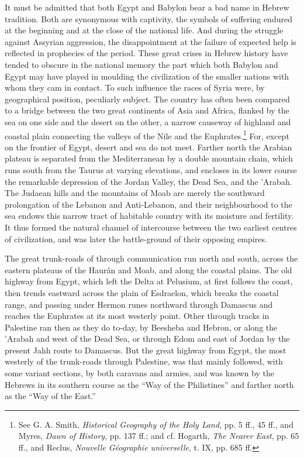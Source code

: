\documentclass[12pt,oneside]{book}
\begin{document}
It must be admitted that both Egypt and Babylon bear a bad name in Hebrew tradition. Both are synonymous with captivity, the symbols of suffering endured at the beginning and at the close of the national life. And during the struggle against Assyrian aggression, the disappointment at the failure of expected help is reflected in prophecies of the period. These great crises in Hebrew history have tended to obscure in the national memory the part which both Babylon and Egypt may have played in moulding the civilization of the smaller nations with whom they cam in contact. To such influence the races of Syria were, by geographical position, peculiarly subject. The country has often been compared to a bridge between the two great continents of Asia and Africa, flanked by the sea on one side and the desert on the other, a narrow causeway of highland and coastal plain connecting the valleys of the Nile and the Euphrates.\footnote{See G. A. Smith, \textit{Historical Geography of the Holy Land}, pp. 5 ff., 45 ff., and Myres, \textit{Dawn of History}, pp. 137 ff.; and cf. Hogarth, \textit{The Nearer East}, pp. 65 ff., and Reclus, \textit{Nouvelle G\'eographie universelle}, t. IX, pp. 685 ff.} For, except on the frontier of Egypt, desert and sea do not meet. Farther north the Arabian plateau is separated from the Mediterranean by a double mountain chain, which runs south from the Taurus at varying elevations, and encloses in its lower course the remarkable depression of the Jordan Valley, the Dead Sea, and the 'Arabah. The Judaean hills and the mountains of Moab are merely the southward prolongation of the Lebanon and Anti-Lebanon, and their neighbourhood to the sea endows this narrow tract of habitable country with its moisture and fertility. It thus formed the natural channel of intercourse between the two earliest centres of civilization, and was later the battle-ground of their opposing empires. \par 

The great trunk-roads of through communication run north and south, across the eastern plateaus of the Haur\^an and Moab, and along the coastal plains. The old highway from Egypt, which left the Delta at Pelusium, at first follows the coast, then trends eastward across the plain of Esdraelon, which breaks the coastal range, and passing under Hermon runes northward through Damascus and reaches the Euphrates at its most westerly point. Other through tracks in Palestine ran then as they do to-day, by Beesheba and Hebron, or along the 'Arabah and west of the Dead Sea, or through Edom and east of Jordan by the present Jahh route to Damascus. But the great highway from Egypt, the most westerly of the trunk-roads through Palestine, was that mainly followed, with some variant sections, by both caravans and armies, and was known by the Hebrews in its southern course as the ``Way of the Philistines'' and farther north as the ``Way of the East.'' \par 
\end{document}
